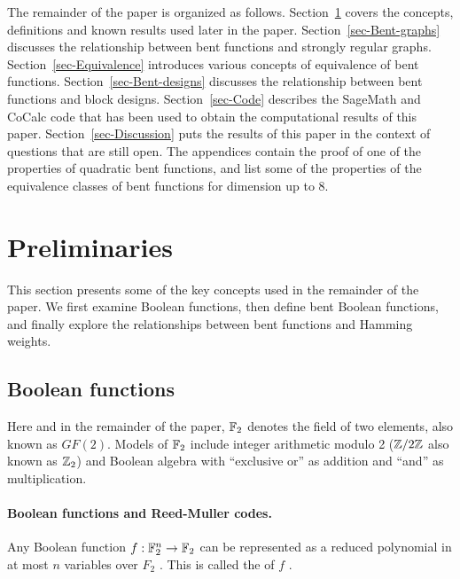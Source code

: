 The remainder of the paper is organized as follows.
Section~\ref{sec-Preliminaries} covers the concepts, definitions and known results used later in the paper.
Section~\ref{sec-Bent-graphs} discusses the relationship between bent functions and strongly regular graphs.
Section~\ref{sec-Equivalence} introduces various concepts of equivalence of bent functions.
Section~\ref{sec-Bent-designs} discusses the relationship between bent functions and block designs.
Section~\ref{sec-Code} describes the SageMath and CoCalc code that has been used to obtain
the computational results of this paper.
Section~\ref{sec-Discussion} puts the results of this paper in the context of questions that are still open.
The appendices contain the proof of one of the properties of quadratic bent functions,
and list some of the properties of the equivalence classes of bent functions for dimension up to 8.

\section{Preliminaries}
\label{sec-Preliminaries}

This section presents some of the key concepts used in the remainder of the paper.
We first examine Boolean functions, then define bent Boolean functions,
and finally explore the relationships between bent functions
and Hamming weights.

\subsection{Boolean functions}
\label{sec-Boolean-functions}

Here and in the remainder of the paper, $\mathbb{F}_2$ denotes the field of two elements,
also known as $GF(2)$. Models of $\mathbb{F}_2$ include integer arithmetic modulo 2
($\mathbb{Z}/2\mathbb{Z}$ also known as $\mathbb{Z}_2$) and Boolean algebra with ``exclusive or'' as addition and ``and''
as multiplication.
\paragraph*{Boolean functions and Reed-Muller codes.}
Any Boolean function $f : \mathbb{F}_2^n \rightarrow \mathbb{F}_2$ can be represented as a reduced polynomial in at most $n$ variables over $F_2$
\cite{Mul54, Rot76} \cite[Ch. III, Section 2]{Dil74}.
This is called the  of $f$ \cite[Chapter 5]{Rue1986}.

